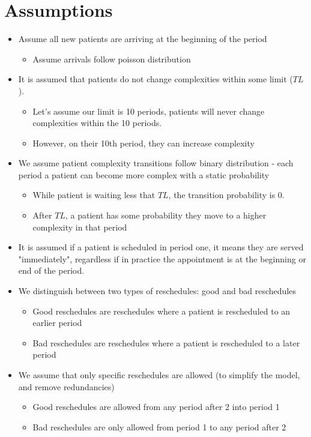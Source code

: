 \documentclass{article}
\begin{document}
\section{Assumptions} 
\begin{itemize}
	\item Assume all new patients are arriving at the beginning of the period 
	\begin{itemize}
		\item Assume arrivals follow poisson distribution
	\end{itemize}		
	
	\item It is assumed that patients do not change complexities within some limit ($TL$). 
	\begin{itemize}
		\item Let's assume our limit is 10 periods, patients will never change complexities within the 10 periods.  
		\item However, on their 10th period, they can increase complexity
	\end{itemize}		
	
	\item We assume patient complexity transitions follow binary distribution - each period a patient can become more complex with a static probability
	\begin{itemize}
		\item While patient is waiting less that $TL$, the transition probability is 0.
		\item After $TL$, a patient has some probability they move to a higher complexity in that period
	\end{itemize}
	
	\item It is assumed if a patient is scheduled in period one, it means they are served "immediately", regardless if in practice the appointment is at the beginning or end of the period.
	\item We distinguish between two types of reschedules: good and bad reschedules
	\begin{itemize}
		\item Good reschedules are reschedules where a patient is rescheduled to an earlier period
		\item Bad reschedules are reschedules where a patient is rescheduled to a later period
	\end{itemize}

	\item We assume that only specific reschedules are allowed (to simplify the model, and remove  redundancies)
	\begin{itemize}
		\item Good reschedules are allowed from any period after 2 into period 1
		\item Bad reschedules are only allowed from period 1 to any period after 2
	\end{itemize}
	

\end{itemize}
\end{document}
